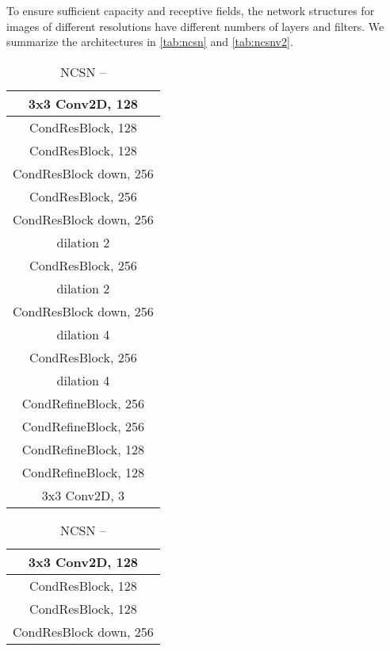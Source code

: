 \documentclass{article}
\begin{document}
To ensure sufficient capacity and receptive fields, the network structures for images of different resolutions have different numbers of layers and filters. We summarize the architectures in \cref{tab:ncsn} and \cref{tab:ncsnv2}.
\begin{table}[h]
    \centering
    \caption{The architectures of NCSN for images of various resolutions.}\label{tab:ncsn}
    \begin{subtable}[t]{0.3\linewidth}
    \centering
    \caption{NCSN --}\label{tab:ncsn_small_arch}
    \begin{tabular}{c}
    \toprule\toprule
    3x3 Conv2D, 128\\
    \midrule
    CondResBlock, 128\\
    \midrule
    CondResBlock, 128\\
    \midrule
    CondResBlock down, 256\\
    \midrule
    CondResBlock, 256\\
    \midrule
    CondResBlock down, 256\\ dilation 2\\
    \midrule
    CondResBlock, 256 \\ dilation 2\\
    \midrule
    CondResBlock down, 256\\ dilation 4\\
    \midrule
    CondResBlock, 256\\ dilation 4\\
    \midrule
    CondRefineBlock, 256\\
    \midrule
    CondRefineBlock, 256\\
    \midrule
    CondRefineBlock, 128\\
    \midrule
    CondRefineBlock, 128\\
    \midrule
    3x3 Conv2D, 3\\
    \bottomrule
    \end{tabular}
    \end{subtable}
    \hspace{3cm}
    \begin{subtable}[t]{0.3\linewidth}
    \centering
    \caption{NCSN --}
    \begin{tabular}{c}
    \toprule\toprule
    3x3 Conv2D, 128\\
    \midrule
    CondResBlock, 128\\
    \midrule
    CondResBlock, 128\\
    \midrule
    CondResBlock down, 256\\

\end{tabular}
\end{subtable}
\end{table}
\end{document}
